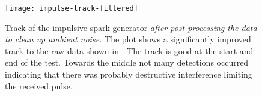 \begin{figure}
  \centering
  \texttt{[image: impulse-track-filtered]}
  \caption{Track of the impulsive spark generator \emph{after post-processing the data to clean up ambient noise.} The plot shows a significantly improved track to the raw data shown in . The track is good at the start and end of the test. Towards the middle not many detections occurred indicating that there was probably destructive interference limiting the received pulse.}
  \label{fig:field-trails:impulse-source-final-track}
\end{figure}
